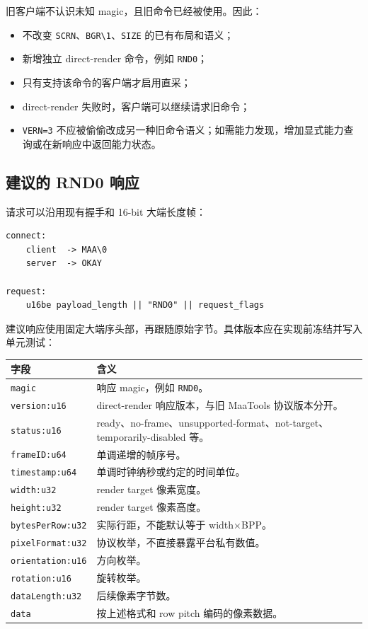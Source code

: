\documentclass[UTF8,a4paper,11pt]{ctexart}
\begin{document}
旧客户端不认识未知 magic，且旧命令已经被使用。因此：

\begin{itemize}
  \item 不改变 \texttt{SCRN}、\texttt{BGR\textbackslash{}1}、\texttt{SIZE} 的已有布局和语义；
  \item 新增独立 direct-render 命令，例如 \texttt{RND0}；
  \item 只有支持该命令的客户端才启用直采；
  \item direct-render 失败时，客户端可以继续请求旧命令；
  \item \texttt{VERN=3} 不应被偷偷改成另一种旧命令语义；如需能力发现，增加显式能力查询或在新响应中返回能力状态。
\end{itemize}

\subsection{建议的 RND0 响应}

请求可以沿用现有握手和 16-bit 大端长度帧：

\begin{lstlisting}
connect:
    client  -> MAA\0
    server  -> OKAY

request:
    u16be payload_length || "RND0" || request_flags
\end{lstlisting}

建议响应使用固定大端序头部，再跟随原始字节。具体版本应在实现前冻结并写入单元测试：

\begin{center}
\small
\begin{tabularx}{\textwidth}{>{\ttfamily}p{} X}
\toprule
字段 & 含义 \\
\midrule
\texttt{magic} & 响应 magic，例如 \texttt{RND0}。\\
\texttt{version:u16} & direct-render 响应版本，与旧 MaaTools 协议版本分开。\\
\texttt{status:u16} & ready、no-frame、unsupported-format、not-target、temporarily-disabled 等。\\
\texttt{frameID:u64} & 单调递增的帧序号。\\
\texttt{timestamp:u64} & 单调时钟纳秒或约定的时间单位。\\
\texttt{width:u32} & render target 像素宽度。\\
\texttt{height:u32} & render target 像素高度。\\
\texttt{bytesPerRow:u32} & 实际行距，不能默认等于 width\(\times\)BPP。\\
\texttt{pixelFormat:u32} & 协议枚举，不直接暴露平台私有数值。\\
\texttt{orientation:u16} & 方向枚举。\\
\texttt{rotation:u16} & 旋转枚举。\\
\texttt{dataLength:u32} & 后续像素字节数。\\
\texttt{data} & 按上述格式和 row pitch 编码的像素数据。\\
\bottomrule
\end{tabularx}
\end{center}
\end{document}
